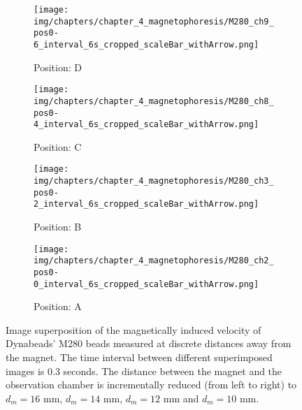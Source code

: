 \begin{figure}[htb]
	\centering
	\begin{subfigure}[b]{0.22\textwidth}
		\texttt{[image: img/chapters/chapter\_4\_magnetophoresis/M280\_ch9\_pos0-6\_interval\_6s\_cropped\_scaleBar\_withArrow.png]}
		\caption{Position: D}
	\end{subfigure}
	\hfill
	\begin{subfigure}[b]{0.22\textwidth}
		\texttt{[image: img/chapters/chapter\_4\_magnetophoresis/M280\_ch8\_pos0-4\_interval\_6s\_cropped\_scaleBar\_withArrow.png]}
		\caption{Position: C}
	\end{subfigure}
	\hfill
	\begin{subfigure}[b]{0.22\textwidth}
		\texttt{[image: img/chapters/chapter\_4\_magnetophoresis/M280\_ch3\_pos0-2\_interval\_6s\_cropped\_scaleBar\_withArrow.png]}
		\caption{Position: B}
	\end{subfigure}
	\hfill
	\begin{subfigure}[b]{0.22\textwidth}
		\texttt{[image: img/chapters/chapter\_4\_magnetophoresis/M280\_ch2\_pos0-0\_interval\_6s\_cropped\_scaleBar\_withArrow.png]}
		\caption{Position: A}
	\end{subfigure}      
	\caption[Magnetically induced velocities of Dynabeads' M280 beads at different magnetophoretic driving forces]{Image superposition of the magnetically induced velocity of Dynabeads' M280 beads measured at discrete distances away from the magnet. The time interval between different superimposed images is $0.3$ seconds. The distance between the magnet and the observation chamber is incrementally reduced (from left to right) to $d_{m}=16$ mm, $d_{m}=14$ mm, $d_{m}=12$ mm and $d_{m}=10$ mm.}
    \label{fig:particleMovement_M280}
\end{figure} 

